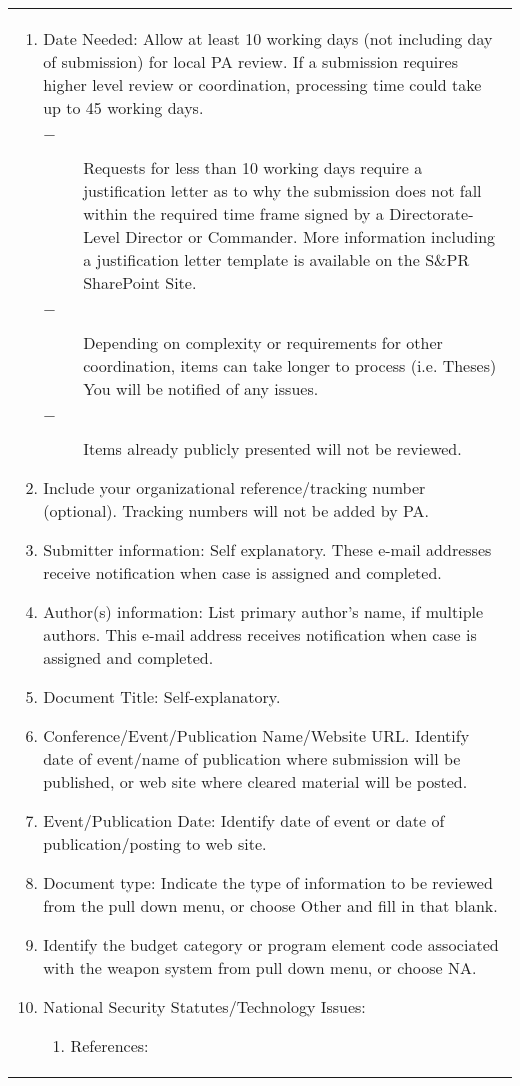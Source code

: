 \documentclass{article}
\begin{document}
{\begin{tabular}{|l|}
{\begin{enumerate}
\item Date Needed:  Allow at least 10 working days (not including day of submission) for local PA review.  If a submission requires higher level review or coordination, processing time could take up to 45 working days.
\begin{description}
  \item[$-$] Requests for less than 10 working days require a justification letter as to why the submission does not fall within the required time frame signed by a Directorate-Level Director or Commander.  More information including a justification letter template is available on the S\&PR SharePoint Site.
  \item[$-$] Depending on complexity or requirements for other coordination, items can take longer to process (i.e. Theses)  You will be notified of any issues.
  \item[$-$] Items already publicly presented will not be reviewed.
\end{description}
\item Include your organizational reference/tracking number (optional). Tracking numbers will not be added by PA.
\item Submitter information:  Self explanatory. These e-mail addresses receive notification when case is assigned and completed.
\item Author(s) information: List primary author’s name, if multiple authors.
This e-mail address receives notification when case is assigned and completed.
\item Document Title: Self-explanatory.
\item Conference/Event/Publication Name/Website URL. Identify date of event/name of publication where submission will be published, or web site where
cleared material will be posted.
\item Event/Publication Date:  Identify date of event or date of publication/posting to web site.
\item Document type:  Indicate the type of information to be reviewed from the pull down menu, or choose Other and fill in that blank.
\item Identify the budget category or program element code associated with the weapon system from pull down menu, or choose NA.
\item National Security Statutes/Technology Issues:
\begin{enumerate}
  \item References:

\end{enumerate}
\end{enumerate}}
\end{tabular}}
\end{document}
